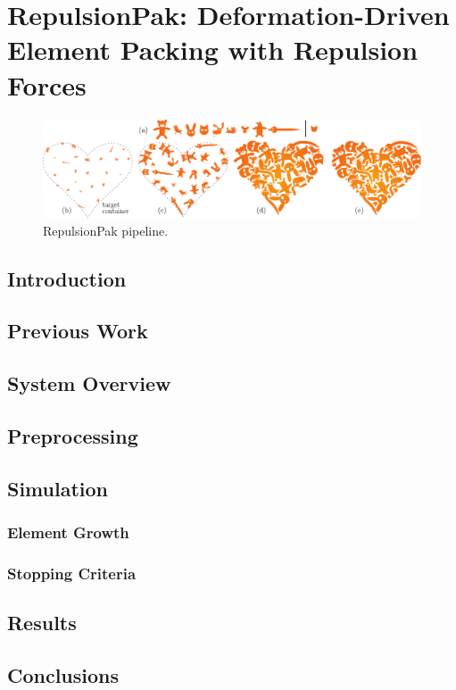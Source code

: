 
\chapter{RepulsionPak: Deformation-Driven Element Packing with Repulsion Forces}

\begin{figure}
\centering
\includegraphics[width=1.0\textwidth]{figures/repulsionpak/pipeline.pdf} 
\caption{\label{fig_repulsionpak_pipeline} 
RepulsionPak pipeline. }
\end{figure}

\section{Introduction}
\section{Previous Work}
\section{System Overview}
\section{Preprocessing}
\section{Simulation}
\subsection{Element Growth}
\subsection{Stopping Criteria}
\section{Results}
\section{Conclusions}
